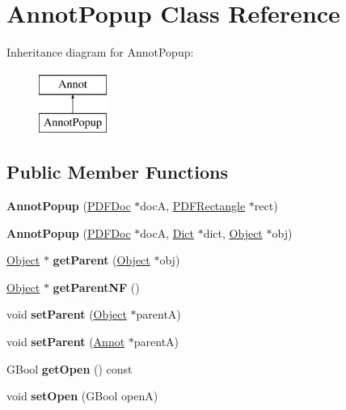\hypertarget{class_annot_popup}{}\section{Annot\+Popup Class Reference}
\label{class_annot_popup}
Inheritance diagram for Annot\+Popup\+:\begin{figure}[H]
\begin{center}
\leavevmode
\includegraphics[height=2.000000cm]{class_annot_popup}
\end{center}
\end{figure}
\subsection*{Public Member Functions}
\begin{DoxyCompactItemize}
\item 
\mbox{\label{class_annot_popup_ab9a468d3205a1a80f08321f8d13bb6f5}} 
{\bfseries Annot\+Popup} (\hyperlink{class_p_d_f_doc}{P\+D\+F\+Doc} $\ast$docA, \hyperlink{class_p_d_f_rectangle}{P\+D\+F\+Rectangle} $\ast$rect)
\item 
\mbox{\label{class_annot_popup_a2d26dabfad0432665e5f3569ece55ed2}} 
{\bfseries Annot\+Popup} (\hyperlink{class_p_d_f_doc}{P\+D\+F\+Doc} $\ast$docA, \hyperlink{class_dict}{Dict} $\ast$dict, \hyperlink{class_object}{Object} $\ast$obj)
\item 
\mbox{\label{class_annot_popup_a28c1b4c0a57f29c828aad65e13859f26}} 
\hyperlink{class_object}{Object} $\ast$ {\bfseries get\+Parent} (\hyperlink{class_object}{Object} $\ast$obj)
\item 
\mbox{\label{class_annot_popup_a0ce34f4000a3b7c1b9d6b7a9a2fcb4ad}} 
\hyperlink{class_object}{Object} $\ast$ {\bfseries get\+Parent\+NF} ()
\item 
\mbox{\label{class_annot_popup_a380a3e86cbda933e0500e1f1ad71017e}} 
void {\bfseries set\+Parent} (\hyperlink{class_object}{Object} $\ast$parentA)
\item 
\mbox{\label{class_annot_popup_a7cdd53b6d059028b2983e558ed18c350}} 
void {\bfseries set\+Parent} (\hyperlink{class_annot}{Annot} $\ast$parentA)
\item 
\mbox{\label{class_annot_popup_a7daae76e5f72db038b673b3179d56ac3}} 
G\+Bool {\bfseries get\+Open} () const
\item 
\mbox{\label{class_annot_popup_a7b4d58891544979eb1948bfce2e91870}} 
void {\bfseries set\+Open} (G\+Bool openA)
\end{DoxyCompactItemize}
